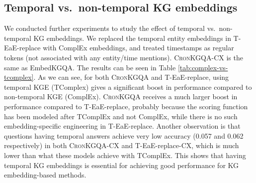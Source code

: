 \documentclass[11pt,a4paper]{article}
\newcommand{\method}{\textsc{CronKGQA}}
\begin{document}
\subsection{Temporal vs.\ non-temporal KG embeddings}
\label{sec:temp_vs_nontemp}

We conducted further experiments to study the effect of temporal vs.\ non-temporal KG embeddings. We replaced the temporal entity embeddings in T-EaE-replace with ComplEx embeddings, and treated timestamps as regular tokens (not associated with any entity/time mentions). \method{}-CX is the same as EmbedKGQA. The results can be seen in Table \ref{tab:complex-vs-tcomplex}. As we can see, for both \method{} and T-EaE-replace, using temporal KGE (TComplex) gives a significant boost in performance compared to non-temporal KGE (ComplEx). \method{} receives a much larger boost in performance compared to T-EaE-replace, probably because the scoring function has been modeled after TComplEx and not ComplEx, while there is no such embedding-specific engineering in T-EaE-replace. Another observation is that questions having temporal answers achieve very low accuracy (0.057 and 0.062 respectively) in both \method{}-CX and T-EaE-replace-CX, which is much lower than what these models achieve with TComplEx. This shows that having temporal KG embeddings is essential for achieving good performance for KG embedding-based methods.
\end{document}
